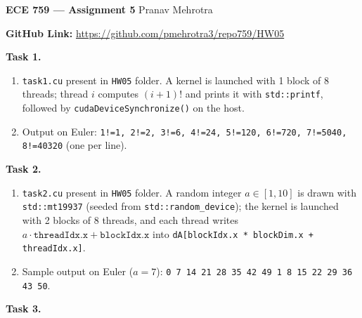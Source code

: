 \documentclass[11pt]{article}
\begin{document}
\noindent\textbf{ECE 759 --- Assignment 5} \hfill Pranav Mehrotra \\

\vspace{1.5em}

\noindent\textbf{GitHub Link:} \url{https://github.com/pmehrotra3/repo759/HW05}

\vspace{1.5em}
\noindent\textbf{Task 1.}\\

\begin{enumerate}
  \item[a)] \texttt{task1.cu} present in \texttt{HW05} folder. A kernel is launched with 1 block of 8 threads; thread $i$ computes $(i+1)!$ and prints it with \texttt{std::printf}, followed by \texttt{cudaDeviceSynchronize()} on the host.
  \item[b)] Output on Euler: \texttt{1!=1, 2!=2, 3!=6, 4!=24, 5!=120, 6!=720, 7!=5040, 8!=40320} (one per line).
\end{enumerate}

\vspace{1.5em}
\noindent\textbf{Task 2.}\\

\begin{enumerate}
  \item[a)] \texttt{task2.cu} present in \texttt{HW05} folder. A random integer $a \in [1, 10]$ is drawn with \texttt{std::mt19937} (seeded from \texttt{std::random\_device}); the kernel is launched with 2 blocks of 8 threads, and each thread writes $a \cdot \texttt{threadIdx.x} + \texttt{blockIdx.x}$ into \texttt{dA[blockIdx.x * blockDim.x + threadIdx.x]}.
  \item[b)] Sample output on Euler ($a = 7$): \texttt{0 7 14 21 28 35 42 49 1 8 15 22 29 36 43 50}.
\end{enumerate}

\vspace{1.5em}
\noindent\textbf{Task 3.}\\
\end{document}
